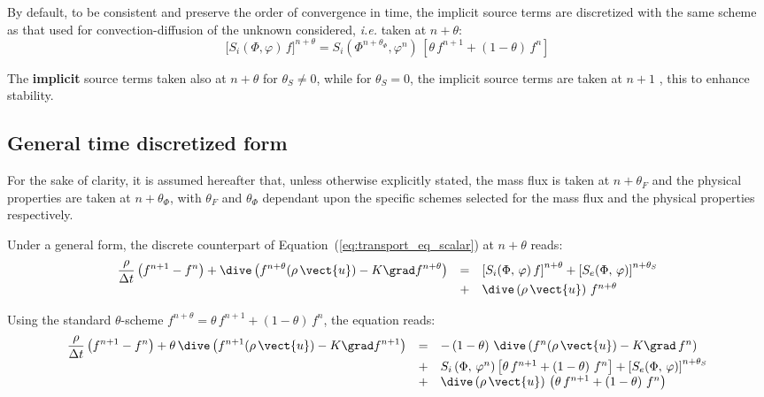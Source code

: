 By default, to be consistent and preserve the order of convergence in time,
the implicit source terms are discretized with the same scheme as that used
for convection-diffusion of the unknown considered, \emph{i.e.} taken at $%
n+\theta $:
\begin{equation}
\lbrack S_{i}(\Phi ,\varphi )\,f]^{n+\theta }=S_{i}(\Phi ^{n+\theta _{\Phi
}},\varphi ^{n})\,[\theta \,f^{n+1}+(1-\theta )\,f^{n}]
\end{equation}

\begin{remark}
The \textbf{implicit} source terms taken also at $n+\theta $ for $\theta
_{S}\neq 0$, while for $\theta _{S}=0$, the implicit source terms are taken
at $n+1$ , this to enhance stability.
\end{remark}

\subsection{General time discretized form}

For the sake of clarity, it is assumed hereafter that, unless otherwise
explicitly stated, the mass flux is taken at $n+\theta_F$ and the physical
properties are taken at $n+\theta_\Phi$, with $\theta_F$ and $\theta_\Phi$
dependant upon the specific schemes selected for the mass flux and the
physical properties respectively.

Under a general form, the discrete counterpart of Equation~(\ref{eq:transport_eq_scalar}) at
$n+\theta$ reads:
\begin{equation}
\begin{array}{rcl}
\displaystyle \frac{\rho}{\Delta t} \left(f^{n+1}-f^{n}\right)+ \dive \left(f^{n+\theta}(\rho\,%
\vect{u}) - K \grad f^{n+\theta} \right) &=&
\left[S_{i}(\Phi, \, \varphi)\,f\right]^{n+\theta} + \left[S_{e}(\Phi, \, \varphi)
\right]^{n+\theta_{S}} \\
&+& \dive \left(\rho\,\vect{u} \right)\,f^{n+\theta}%
\end{array}%
\end{equation}

Using the standard $\theta$-scheme $f^{n+\theta}=\theta\,f^{n+1}+\left(1-\theta \right)%
\,f^{n}$, the equation reads:
\begin{equation}
\begin{array}{rcl}
\displaystyle \frac{\rho}{\Delta t} \left(f^{n+1}-f^{n} \right)
+ \theta\,\dive \left( f^{n+1}(\rho\,%
\vect{u}) - K \grad f^{n+1} \right) &=& 
- \left(1-\theta\right)\,\dive \left(f^{n} (\rho\,\vect{u}) -K %
\grad \,f^{n}\right)  \\
&+& S_{i}\left(\Phi , \,\varphi^n\right)\left[\theta\,f^{n+1}+ \left(1-\theta \right)\,f^{n}\right] 
+ \left[ S_{e}(\Phi, \, \varphi)\right]^{n+\theta_{S}} \\
&+& \dive \left(\rho\,\vect{u} \right)
\,\left(\theta\,f^{n+1}+\left(1-\theta\right)\,f^{n}\right)%
\end{array}%
\end{equation}

